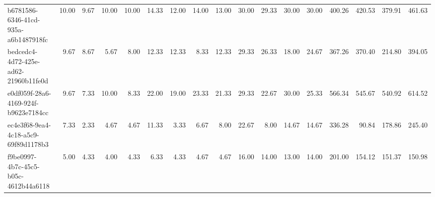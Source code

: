 \begin{longtable}{lrrrrrrrrrrrrrrrr}
b6781586-6346-41cd-935a-a6b1487918fc & 10.00 & 9.67 & 10.00 & 10.00 & 14.33 & 12.00 & 14.00 & 13.00 & 30.00 & 29.33 & 30.00 & 30.00 & 400.26 & 420.53 & 379.91 & 461.63 \\
bedcedc4-4d72-425e-ad62-21960b11fe0d & 9.67 & 8.67 & 5.67 & 8.00 & 12.33 & 12.33 & 8.33 & 12.33 & 29.33 & 26.33 & 18.00 & 24.67 & 367.26 & 370.40 & 214.80 & 394.05 \\
e0df059f-28a6-4169-924f-b9623e7184cc & 9.67 & 7.33 & 10.00 & 8.33 & 22.00 & 19.00 & 23.33 & 21.33 & 29.33 & 22.67 & 30.00 & 25.33 & 566.34 & 545.67 & 540.92 & 614.52 \\
ec4e3f68-9ea4-4c18-a5c9-69f89d1178b3 & 7.33 & 2.33 & 4.67 & 4.67 & 11.33 & 3.33 & 6.67 & 8.00 & 22.67 & 8.00 & 14.67 & 14.67 & 336.28 & 90.84 & 178.86 & 245.40 \\
f9be0997-4b7c-45c5-b05c-4612b44a6118 & 5.00 & 4.33 & 4.00 & 4.33 & 6.33 & 4.33 & 4.67 & 4.67 & 16.00 & 14.00 & 13.00 & 14.00 & 201.00 & 154.12 & 151.37 & 150.98 \\
\end{longtable}
